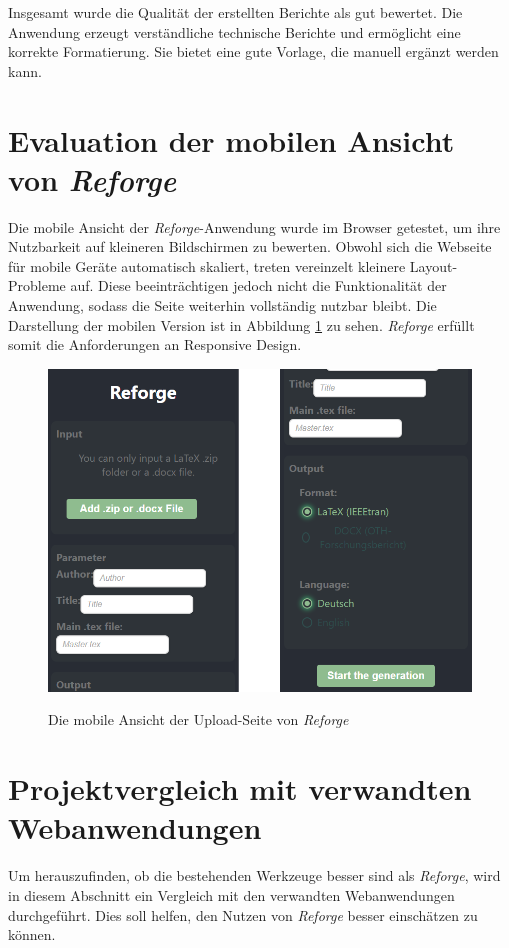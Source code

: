 Insgesamt wurde die Qualität der erstellten Berichte als gut bewertet. Die Anwendung erzeugt verständliche technische Berichte und ermöglicht eine korrekte Formatierung. Sie bietet eine gute Vorlage, die manuell ergänzt werden kann.

\section{Evaluation der mobilen Ansicht von \textit{Reforge}}

Die mobile Ansicht der \textit{Reforge}-Anwendung wurde im Browser getestet, um ihre Nutzbarkeit auf kleineren Bildschirmen zu bewerten. Obwohl sich die Webseite für mobile Geräte automatisch skaliert, treten vereinzelt kleinere Layout-Probleme auf. Diese beeinträchtigen jedoch nicht die Funktionalität der Anwendung, sodass die Seite weiterhin vollständig nutzbar bleibt. Die Darstellung der mobilen Version ist in Abbildung \ref{fig:MobileRefUP} zu sehen. \textit{Reforge} erfüllt somit die Anforderungen an Responsive Design. 

\begin{figure}[H]
\centering
\includegraphics[width=0.8\linewidth]{Images/MobileReforge.png}\\
\caption{Die mobile Ansicht der Upload-Seite von \textit{Reforge}}
\label{fig:MobileRefUP}
\end{figure}

\section{Projektvergleich mit verwandten Webanwendungen}
Um herauszufinden, ob die bestehenden Werkzeuge besser sind als \textit{Reforge}, wird in diesem Abschnitt ein Vergleich mit den verwandten Webanwendungen durchgeführt. Dies soll helfen, den Nutzen von \textit{Reforge} besser einschätzen zu können. 

